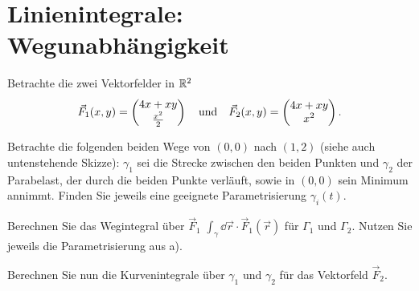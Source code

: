 \documentclass{scrartcl}
\begin{document}
\section{Linienintegrale: Wegunabhängigkeit }
\label{sec:linienintegrale_wegunabh_ngigkeit}

Betrachte die zwei Vektorfelder in $\mathbb{R}^2$
\[
  \vec F_1(x, y) = \begin{pmatrix}4x + xy \\ \frac{x^2}{2}\end{pmatrix} \quad \mbox{und} \quad \vec F_2 (x, y) = \begin{pmatrix}4x + xy \\ x^2\end{pmatrix}.
\]
\begin{subex}
  \item{} Betrachte die folgenden beiden Wege von $(0,0)$ nach $(1,2)$ (siehe auch untenstehende Skizze):
  $\gamma_1$ sei die Strecke zwischen den beiden Punkten und $\gamma_2$ der Parabelast, der durch die beiden Punkte verläuft, sowie in $(0,0)$ sein Minimum annimmt.
  Finden Sie jeweils eine geeignete Parametrisierung $\gamma_i(t)$.
  \item{} Berechnen Sie das Wegintegral über $\vec F_1$ $\int_\gamma \dd \vec r \cdot \vec F_1(\vec r)$ für $\Gamma_1$ und $\Gamma_2$.
  Nutzen Sie jeweils die Parametrisierung aus a).
  \item{} Berechnen Sie nun die Kurvenintegrale über $\gamma_1$ und $\gamma_2$ für das Vektorfeld $\vec F_2$.
\end{subex}

\begin{center}
\end{center}
\end{document}
